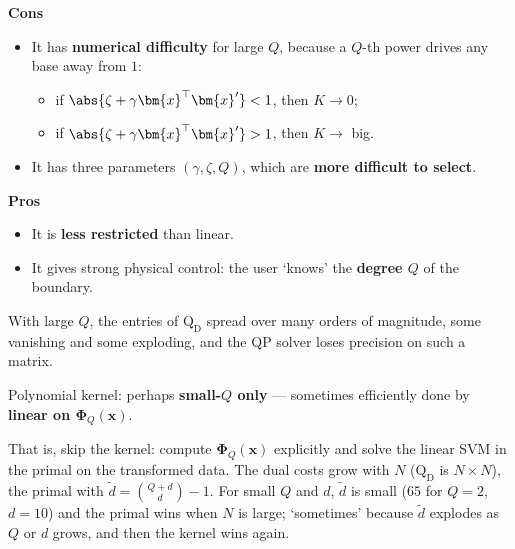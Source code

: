 \begin{center}
    \begin{minipage}[t]{0.47\textwidth}
        \raggedright\textbf{Cons}
        \begin{itemize}
            \item It has \textbf{numerical difficulty} for large \(Q\),
                because a \(Q\)-th power drives any base away from \(1\):
                \begin{itemize}
                    \item if \(\abs{\zeta + \gamma \bm{x}^\top \bm{x}'} <
                        1\), then \(K \to 0\);
                    \item if \(\abs{\zeta + \gamma \bm{x}^\top \bm{x}'} >
                        1\), then \(K \to\) big.
                \end{itemize}
            \item It has three parameters \((\gamma, \zeta, Q)\), which are
                \textbf{more difficult to select}.
        \end{itemize}
    \end{minipage}%
    \hfill
    \begin{minipage}[t]{0.47\textwidth}
        \raggedright\textbf{Pros}
        \begin{itemize}
            \item It is \textbf{less restricted} than linear.
            \item It gives strong physical control: the user `knows' the
                \textbf{degree \(Q\)} of the boundary.
        \end{itemize}
    \end{minipage}
\end{center}

With large \(Q\), the entries of \(\mathrm{Q}_{\mathrm{D}}\) spread over many
orders of magnitude, some vanishing and some exploding, and the QP solver
loses precision on such a matrix.

\begin{moral}
    Polynomial kernel: perhaps \textbf{small-\(Q\) only} --- sometimes
    efficiently done by \textbf{linear on \(\bm{\Phi}_Q(\bm{x})\)}.
\end{moral}

That is, skip the kernel: compute \(\bm{\Phi}_Q(\bm{x})\) explicitly and
solve the linear SVM in the primal on the transformed data. The dual costs
grow with \(N\) (\(\mathrm{Q}_{\mathrm{D}}\) is \(N \times N\)), the primal
with \(\tilde{d} = \binom{Q+d}{d} - 1\). For small \(Q\) and \(d\),
\(\tilde{d}\) is small (\(65\) for \(Q = 2\), \(d = 10\)) and the primal wins
when \(N\) is large; `sometimes' because \(\tilde{d}\) explodes as \(Q\) or
\(d\) grows, and then the kernel wins again.

